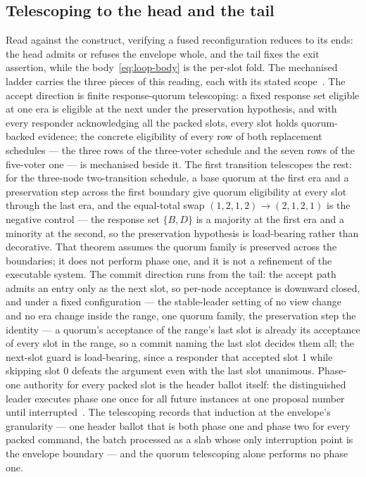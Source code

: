 \documentclass[10pt,journal,letterpaper]{IEEEtran}
\begin{document}
\subsection{Telescoping to the head and the tail}
Read against the construct, verifying a fused reconfiguration reduces to its ends: the head admits or refuses the envelope whole, and the tail fixes the exit assertion, while the body~\eqref{eq:loop-body} is the per-slot fold. The mechanised ladder carries the three pieces of this reading, each with its stated scope~\cite{artifact}. The accept direction is finite response-quorum telescoping: a fixed response set eligible at one era is eligible at the next under the preservation hypothesis, and with every responder acknowledging all the packed slots, every slot holds quorum-backed evidence; the concrete eligibility of every row of both replacement schedules --- the three rows of the three-voter schedule and the seven rows of the five-voter one --- is mechanised beside it. The first transition telescopes the rest: for the three-node two-transition schedule, a base quorum at the first era and a preservation step across the first boundary give quorum eligibility at every slot through the last era, and the equal-total swap $(1,2,1,2) \to (2,1,2,1)$ is the negative control --- the response set $\{B,D\}$ is a majority at the first era and a minority at the second, so the preservation hypothesis is load-bearing rather than decorative. That theorem assumes the quorum family is preserved across the boundaries; it does not perform phase one, and it is not a refinement of the executable system. The commit direction runs from the tail: the accept path admits an entry only as the next slot, so per-node acceptance is downward closed, and under a fixed configuration --- the stable-leader setting of no view change and no era change inside the range, one quorum family, the preservation step the identity --- a quorum's acceptance of the range's last slot is already its acceptance of every slot in the range, so a commit naming the last slot decides them all; the next-slot guard is load-bearing, since a responder that accepted slot 1 while skipping slot 0 defeats the argument even with the last slot unanimous.
Phase-one authority for every packed slot is the header ballot itself: the distinguished leader executes phase one once for all future instances at one proposal number until interrupted~\cite{pms}. The telescoping records that induction at the envelope's granularity --- one header ballot that is both phase one and phase two for every packed command, the batch processed as a slab whose only interruption point is the envelope boundary --- and the quorum telescoping alone performs no phase one.
\end{document}
